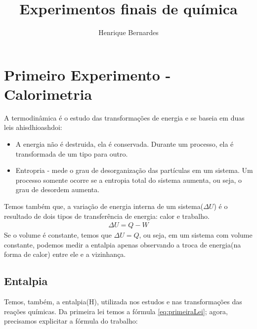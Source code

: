 \documentclass{article}
\begin{document}
\title{Experimentos finais de química}
\author{Henrique Bernardes}
\maketitle
\thispagestyle{empty}
\section{Primeiro Experimento - Calorimetria}

A termodinâmica é o estudo das transformações de energia e se baseia em duas leis ahisdhioashdoi:
\begin{itemize}
  \item A energia não é destruida, ela é conservada. Durante um processo, ela é transformada de um tipo para outro.
  \item Entropria - mede o grau de desorganização das partículas em um sistema. Um processo somente ocorre se a entropia total do sistema aumenta, ou seja, o grau de desordem aumenta.
\end{itemize}
Temos também que, a variação de energia interna de um sistema($\Delta U$) é o resultado de dois tipos de transferência de energia: calor e trabalho.
\begin{align}
  \Delta U = Q - W
  \label{eq:primeiraLei}
\end{align}
Se o volume é constante, temos que $\Delta U = Q$, ou seja, em um sistema com volume constante, podemos medir a entalpia apenas observando a troca de energia(na forma de calor) entre ele e a vizinhança.

\subsection{Entalpia}
Temos, também, a entalpia(H), utilizada nos estudos e nas transformações das reações químicas.
Da primeira lei temos a fórmula \ref{eq:primeiraLei}; agora, precisamos explicitar a fórmula do trabalho:
\end{document}
